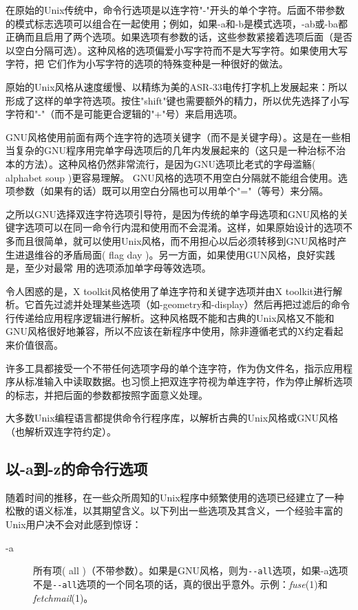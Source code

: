 \documentclass[12pt,oneside]{book}
\begin{document}
\begin{common-format}
在原始的Unix传统中，命令行选项是以连字符"-"开头的单个字符。后面不带参数的模式标志选项可以组合在一起使用；例如，如果-a和-b是模式选项，-ab或-ba都正确而且启用了两个选项。如果选项有参数的话，这些参数紧接着选项后面（是否以空白分隔可选）。这种风格的选项偏爱小写字符而不是大写字符。如果使用大写字符，把
它们作为小写字符的选项的特殊变种是一种很好的做法。

原始的Unix风格从速度缓慢、以精练为美的ASR-33电传打字机上发展起来：所以形成了这样的单字符选项。按住"shift"键也需要额外的精力，所以优先选择了小写字符和"-"（而不是可能更合逻辑的"+"号）来启用选项。

GNU风格使用前面有两个连字符的选项关键字（而不是关键字母）。这是在一些相当复杂的GNU程序用完单字母选项后的几年内发展起来的（这只是一种治标不治本的方法）。这种风格仍然非常流行，是因为GNU选项比老式的字母滥觞( alphabet soup )更容易理解。 GNU风格的选项不用空白分隔就不能组合使用。选项参数（如果有的话）既可以用空白分隔也可以用单个"="（等号）来分隔。

之所以GNU选择双连字符选项引导符，是因为传统的单字母选项和GNU风格的关键字选项可以在同一命令行内混和使用而不会混淆。这样，如果原始设计的选项不多而且很简单，就可以使用Unix风格，而不用担心以后必须转移到GNU风格时产生进退维谷的矛盾局面( flag day )。另一方面，如果使用GUN风格，良好实践是，至少对最常
用的选项添加单字母等效选项。

令人困惑的是，X toolkit风格使用了单连字符和关键字选项并由X toolkit进行解析。它首先过滤并处理某些选项（如-geometry和-display）然后再把过滤后的命令行传递给应用程序逻辑进行解析。这种风格既不能和古典的Unix风格又不能和GNU风格很好地兼容，所以不应该在新程序中使用，除非遵循老式的X约定看起来价值很高。

许多工具都接受一个不带任何选项字母的单个连字符，作为伪文件名，指示应用程序从标准输入中读取数据。也习惯上把双连字符视为单连字符，作为停止解析选项的标志，并把后面的参数都按照字面意义处理。

大多数Unix编程语言都提供命令行程序库，以解析古典的Unix风格或GNU风格（也解析双连字符约定）。

\subsection{以-a到-z的命令行选项}
随着时间的推移，在一些众所周知的Unix程序中频繁使用的选项已经建立了一种松散的语义标准，以其期望含义。以下列出一些选项及其含义，一个经验丰富的Unix用户决不会对此感到惊讶：
\begin{description}
\item[-a] 所有项( all )（不带参数）。如果是GNU风格，则为\verb+--all+选项，如果-a选项不是\verb+--all+选项的一个同名项的话，真的很出乎意外。示例：\textit{fuse}(1)和\textit{fetchmail}(1)。


\end{description}
\end{common-format}
\end{document}
